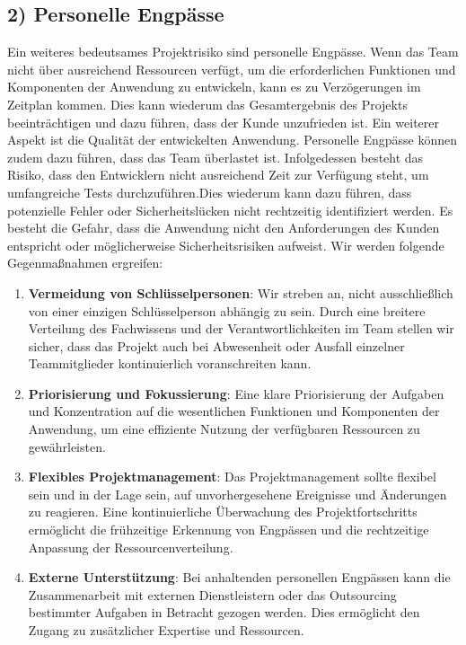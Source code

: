 \subsection*{2) Personelle Engpässe}
Ein weiteres bedeutsames Projektrisiko sind personelle Engpässe.
Wenn das Team nicht über ausreichend Ressourcen verfügt, um die erforderlichen Funktionen und Komponenten der Anwendung zu entwickeln, kann es zu Verzögerungen im Zeitplan kommen.
Dies kann wiederum das Gesamtergebnis des Projekts beeinträchtigen und dazu führen, dass der Kunde unzufrieden ist.
Ein weiterer Aspekt ist die Qualität der entwickelten Anwendung.
Personelle Engpässe können zudem dazu führen, dass das Team überlastet ist.
Infolgedessen besteht das Risiko, dass den Entwicklern nicht ausreichend Zeit zur Verfügung steht, um umfangreiche Tests durchzuführen.Dies wiederum kann dazu führen, dass potenzielle Fehler oder Sicherheitslücken nicht rechtzeitig identifiziert werden.
Es besteht die Gefahr, dass die Anwendung nicht den Anforderungen des Kunden entspricht oder möglicherweise Sicherheitsrisiken aufweist.
Wir werden folgende Gegenmaßnahmen ergreifen:
\begin{enumerate}
    \item \textbf{Vermeidung von Schlüsselpersonen}: Wir streben an, nicht ausschließlich von einer einzigen Schlüsselperson abhängig zu sein. Durch eine breitere Verteilung des Fachwissens und der Verantwortlichkeiten im Team stellen wir sicher, dass das Projekt auch bei Abwesenheit oder Ausfall einzelner Teammitglieder kontinuierlich voranschreiten kann.
    \item \textbf{Priorisierung und Fokussierung}: Eine klare Priorisierung der Aufgaben und Konzentration auf die wesentlichen Funktionen und Komponenten der Anwendung, um eine effiziente Nutzung der verfügbaren Ressourcen zu gewährleisten.
    \item \textbf{Flexibles Projektmanagement}: Das Projektmanagement sollte flexibel sein und in der Lage sein, auf unvorhergesehene Ereignisse und Änderungen zu reagieren. Eine kontinuierliche Überwachung des Projektfortschritts ermöglicht die frühzeitige Erkennung von Engpässen und die rechtzeitige Anpassung der Ressourcenverteilung.
    \item \textbf{Externe Unterstützung}: Bei anhaltenden personellen Engpässen kann die Zusammenarbeit mit externen Dienstleistern oder das Outsourcing bestimmter Aufgaben in Betracht gezogen werden. Dies ermöglicht den Zugang zu zusätzlicher Expertise und Ressourcen.
\end{enumerate}

